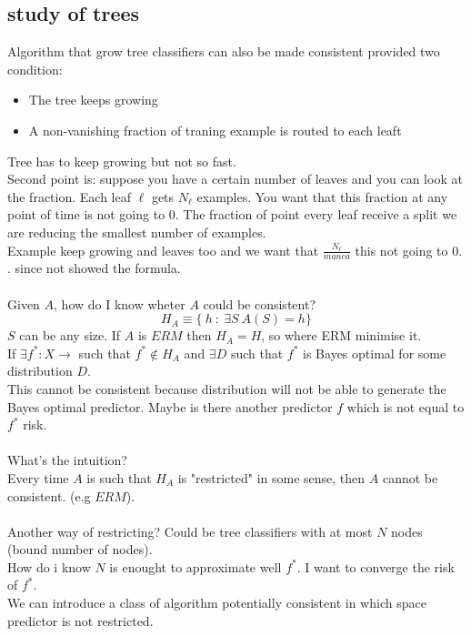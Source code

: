 \documentclass[../main.tex]{subfiles}
\begin{document}
\subsection{study of trees}
Algorithm that grow tree classifiers can also be made consistent provided two condition:
\begin{itemize}
\item The tree keeps growing
\item A non-vanishing fraction of traning example is routed to each leaft
\end{itemize}
Tree has to keep growing but not so fast.\\
Second point is: suppose you have a certain number of leaves and you can look at the fraction. 
Each leaf $\ell$ gets $N_\ell$ examples. You want that this fraction at any point of time is not going to 0. The fraction of point every leaf receive a split we are reducing the smallest number of examples. 
\\Example keep growing and leaves too and we want that $\frac{N_\ell}{manca}$ this not going to 0. $.$ since not showed the formula.
\\\\
Given $A$, how do I know wheter $A$ could be consistent?
$$
H_A \equiv \{ \ h \ : \ \exists S \ A(S) = h \}
$$
$S$ can be any size.
If $A$ is $ERM$ then $H_A = H$, so where ERM minimise it.
\\
If $\exists f^* : X \longrightarrow $ such that $f^* \not\in H_A$ and $\exists D$ such that $f^*$ is Bayes optimal for some distribution $D$.\\
This cannot be consistent because distribution will not be able to generate the Bayes optimal predictor.
Maybe is there another predictor $f$ which is not equal to $f^*$ risk.
\\\\
What's the intuition?
\\Every time $A$ is such that $H_A$ is "restricted" in some sense, then $A$ cannot be consistent. (e.g $ERM$).
\\\\
Another way of restricting? Could be tree classifiers with at most $N$ nodes (bound number of nodes).
\\ How do i know $N$ is enought to approximate well $f^*$.
I want to converge the risk of $f^*$.
\\
We can introduce a class of algorithm potentially consistent in which space predictor is not restricted.
\\\\
\end{document}
